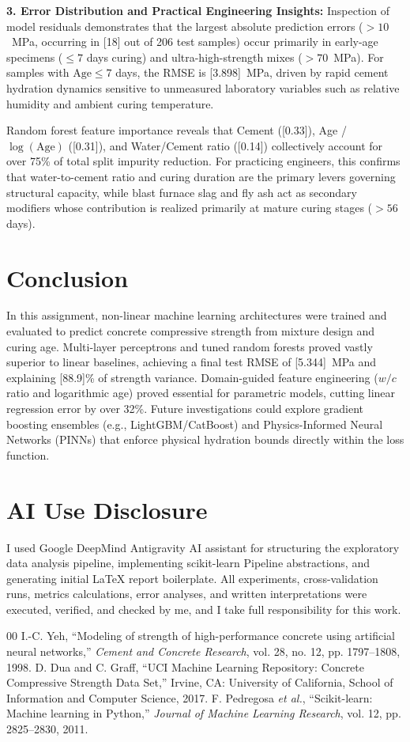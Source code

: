 \documentclass[conference]{IEEEtran}
\begin{document}
\textbf{3. Error Distribution and Practical Engineering Insights:}
Inspection of model residuals demonstrates that the largest absolute prediction errors ($>10$~MPa, occurring in [18] out of 206 test samples) occur primarily in early-age specimens ($\le 7$ days curing) and ultra-high-strength mixes ($>70$~MPa). For samples with $\text{Age} \le 7$ days, the RMSE is [3.898]~MPa, driven by rapid cement hydration dynamics sensitive to unmeasured laboratory variables such as relative humidity and ambient curing temperature.

Random forest feature importance reveals that Cement ([0.33]), Age / $\log(\text{Age})$ ([0.31]), and Water/Cement ratio ([0.14]) collectively account for over 75\% of total split impurity reduction. For practicing engineers, this confirms that water-to-cement ratio and curing duration are the primary levers governing structural capacity, while blast furnace slag and fly ash act as secondary modifiers whose contribution is realized primarily at mature curing stages ($>56$ days).

\section{Conclusion}
In this assignment, non-linear machine learning architectures were trained and evaluated to predict concrete compressive strength from mixture design and curing age. Multi-layer perceptrons and tuned random forests proved vastly superior to linear baselines, achieving a final test RMSE of [5.344]~MPa and explaining [88.9]\% of strength variance. Domain-guided feature engineering ($w/c$ ratio and logarithmic age) proved essential for parametric models, cutting linear regression error by over 32\%. Future investigations could explore gradient boosting ensembles (e.g., LightGBM/CatBoost) and Physics-Informed Neural Networks (PINNs) that enforce physical hydration bounds directly within the loss function.

\section*{AI Use Disclosure}
I used Google DeepMind Antigravity AI assistant for structuring the exploratory data analysis pipeline, implementing scikit-learn Pipeline abstractions, and generating initial LaTeX report boilerplate. All experiments, cross-validation runs, metrics calculations, error analyses, and written interpretations were executed, verified, and checked by me, and I take full responsibility for this work.

\begin{thebibliography}{00}
 I.-C. Yeh, ``Modeling of strength of high-performance concrete using artificial neural networks,'' \textit{Cement and Concrete Research}, vol. 28, no. 12, pp. 1797--1808, 1998.
 D. Dua and C. Graff, ``UCI Machine Learning Repository: Concrete Compressive Strength Data Set,'' Irvine, CA: University of California, School of Information and Computer Science, 2017.
 F. Pedregosa \textit{et al.}, ``Scikit-learn: Machine learning in Python,'' \textit{Journal of Machine Learning Research}, vol. 12, pp. 2825--2830, 2011.
\end{thebibliography}
\end{document}
